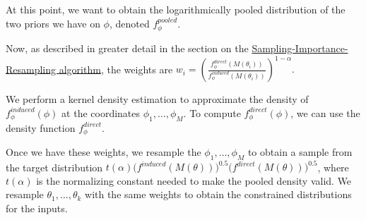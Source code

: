\documentclass[12pt,twoside]{smiththesis}
\begin{document}
At this point, we want to obtain the logarithmically pooled distribution of the two priors we have on \(\phi\), denoted \(f_\phi^{pooled}\).

Now, as described in greater detail in the section on the \protect\hyperlink{logpooled}{Sampling-Importance-Resampling algorithm}, the weights are \(w_i = \left( \frac{f_\phi^{direct}(M(\theta_i))}{f_\phi^{induced}(M(\theta_i))} \right)^{1-\alpha}.\)

We perform a kernel density estimation to approximate the density of \(f_\phi^{induced}(\phi)\) at the coordinates \(\phi_1, \dots, \phi_M\). To compute \(f_\phi^{direct}(\phi)\), we can use the density function \(f_\phi^{direct}\).

Once we have these weights, we resample the \(\phi_1,\dots,\phi_M\) to obtain a sample from the target distribution \(t(\alpha) \Big( f^{induced}(M(\theta)) \Big)^{0.5} \Big( f^{direct} (M(\theta)) \Big)^{0.5}\), where \(t(\alpha)\) is the normalizing constant needed to make the pooled density valid. We resample \(\theta_1, \dots, \theta_k\) with the same weights to obtain the constrained distributions for the inputs.
\end{document}
